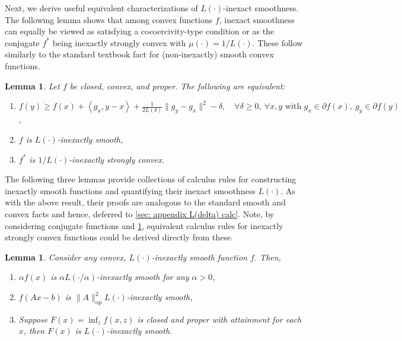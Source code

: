\documentclass[11pt, hidelinks]{article}
\numberwithin{equation}{section}
\theoremstyle{thmstyletwo}%
\newtheorem{lemma}[thm]{Lemma}
\numberwithin{equation}{section}
\newcommand{\inner}[2]{\left\langle {#1}, {#2} \right\rangle}
\begin{document}
Next, we derive useful equivalent characterizations of $L(\cdot)$-inexact smoothness. The following lemma shows that among convex functions $f$, inexact smoothness can equally be viewed as satisfying a cocoercivity-type condition or as the conjugate $f^*$ being inexactly strongly convex with $\mu(\cdot) = 1/L(\cdot)$. These follow similarly to the standard textbook fact for (non-inexactly) smooth convex functions.

\begin{lemma}\label{lemma:L(delta) conjugate equivalence}
    Let $f$ be closed, convex, and proper. The following are equivalent:
    \begin{enumerate}        
        \item $f(y) \geq f(x) + \inner{g_x}{y-x}+\frac{1}{2L(\delta)}\|g_y-g_x\|^2 - \delta, \quad \forall \delta \geq 0, \ \forall x,y \text{ with } g_x \in \partial f(x),\ g_y\in \partial f(y)$,
        \item $f$ is $L(\cdot)$-inexactly smooth,
        \item $f^*$ is $1/L(\cdot)$-inexactly strongly convex. %
    \end{enumerate}
\end{lemma}


The following three lemmas provide collections of calculus rules for constructing inexactly smooth functions and quantifying their inexact smoothness $L(\cdot)$. As with the above result, their proofs are analogous to the standard smooth and convex facts and hence, deferred to \cref{sec: appendix L(delta) calc}. Note, by considering conjugate functions and \cref{lemma:L(delta) conjugate equivalence}, equivalent calculus rules for inexactly strongly convex functions could be derived directly from these.
\begin{lemma}\label{L(delta) scaling calculus}
    Consider any convex, $L(\cdot)$-inexactly smooth function $f$. Then, 
    \begin{enumerate}
        \item $\alpha f(x)$ is $\alpha L(\cdot/\alpha)$-inexactly smooth for any $\alpha > 0$,
        \item $f(Ax - b)$ is $\|A\|_{\mathrm{op}}^2L(\cdot)$-inexactly smooth,
        \item Suppose $F(x) = \inf_z f(x,z)$ is closed and proper with attainment for each $x$, then $F(x)$ is $L(\cdot)$-inexactly smooth.
    \end{enumerate}
\end{lemma}
\end{document}

